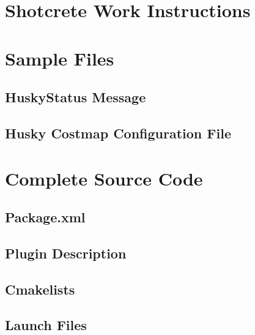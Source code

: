 \appendix
\chapter{Shotcrete Work Instructions}
\label{sec:shotcreteapp}

\chapter{Sample Files}
\section{HuskyStatus Message}
\label{app:huskystatus}
\section{Husky Costmap Configuration File}
\label{app:huskyconfig}
\chapter{Complete Source Code}
\label{app:code}
\section{Package.xml}
\label{app:pack} 
  \begin{adjustwidth}{-1in}{-.8in}
\end{adjustwidth}
\section{Plugin Description}
\label{app:plug} 
  \begin{adjustwidth}{-1in}{-.8in}
\end{adjustwidth}
\section{Cmakelists}
\label{app:cmake} 
  \begin{adjustwidth}{-1in}{-.8in}
\end{adjustwidth}
\section{Launch Files}
\label{app:launch}
  \begin{adjustwidth}{-1in}{-.8in}
\end{adjustwidth}
